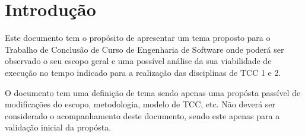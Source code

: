 \section{Introdução}

Este documento tem o propósito de apresentar um tema proposto para o
Trabalho de Conclusão de Curso de Engenharia de Software onde poderá
ser observado o seu escopo geral e uma possível análise da sua
viabilidade de execução no tempo indicado para a realização das
disciplinas de TCC 1 e 2.

O documento tem uma definição de tema sendo apenas uma propósta passível de
modificações do escopo, metodologia, modelo de TCC, etc. Não deverá
ser considerado o acompanhamento deste documento, sendo este apenas
para a validação inicial da propósta.

